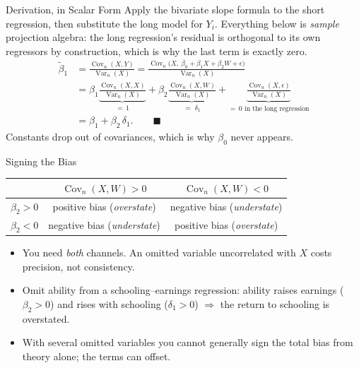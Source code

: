 \documentclass[aspectratio=169,11pt,xcolor=dvipsnames]{beamer}
\DeclareMathOperator{\Cov}{Cov}
\DeclareMathOperator{\Var}{Var}
\begin{document}
\begin{frame}{Derivation, in Scalar Form}
Apply the bivariate slope formula to the short regression, then substitute the
long model for $Y_i$. Everything below is \emph{sample} projection algebra: the
long regression's residual is orthogonal to its own regressors by construction,
which is why the last term is exactly zero.
\begin{align*}
  \tilde\beta_1
  &= \frac{\Cov_n(X,Y)}{\Var_n(X)}
   = \frac{\Cov_n\big(X,\ \beta_0 + \beta_1X + \beta_2 W + \epsilon\big)}
          {\Var_n(X)} \\[4pt]
  &= \beta_1\underbrace{\frac{\Cov_n(X,X)}{\Var_n(X)}}_{=\,1}
   + \beta_2\underbrace{\frac{\Cov_n(X,W)}{\Var_n(X)}}_{=\;\delta_1}
   + \underbrace{\frac{\Cov_n(X,\epsilon)}{\Var_n(X)}}_{=\,0
     \text{ in the long regression}} \\[4pt]
  &= \beta_1 + \beta_2\,\delta_1 . \qquad\blacksquare
\end{align*}
\vskip2pt
Constants drop out of covariances, which is why $\beta_0$ never appears.
\end{frame}

\begin{frame}{Signing the Bias}
\begin{center}
\renewcommand{\arraystretch}{1.3}
\begin{tabular}{lcc}
\toprule
 & $\Cov_n(X, W) > 0$ & $\Cov_n(X,W) < 0$ \\
\midrule
$\beta_2 > 0$ & positive bias (\emph{overstate}) & negative bias (\emph{understate}) \\
$\beta_2 < 0$ & negative bias (\emph{understate}) & positive bias (\emph{overstate}) \\
\bottomrule
\end{tabular}
\end{center}
\vskip8pt
\begin{itemize}\itemsep4pt
  \item You need \emph{both} channels. An omitted variable uncorrelated with $X$
        costs precision, not consistency.
  \item Omit ability from a schooling--earnings regression: ability raises
        earnings ($\beta_2>0$) and rises with schooling ($\delta_1>0$)
        $\Rightarrow$ the return to schooling is \alert{overstated}.
  \item With several omitted variables you cannot generally sign the total bias
        from theory alone; the terms can offset.
\end{itemize}
\end{frame}
\end{document}
